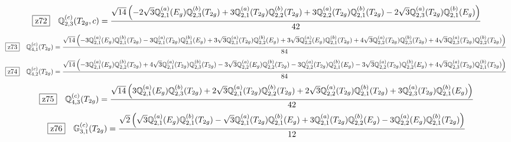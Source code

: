 \documentclass[fleqn,10pt,landscape]{jsarticle}
\begin{document}
\begin{dmath*}
\hspace*{3mm}\fbox{z72}\quad \mathbb{Q}_{2,3}^{(c)}(T_{2g},c)=\frac{\sqrt{14} \left(- 2 \sqrt{3} \mathbb{Q}_{2,1}^{(a)}(E_{g}) \mathbb{Q}_{2,3}^{(b)}(T_{2g}) + 3 \mathbb{Q}_{2,1}^{(a)}(T_{2g}) \mathbb{Q}_{2,2}^{(b)}(T_{2g}) + 3 \mathbb{Q}_{2,2}^{(a)}(T_{2g}) \mathbb{Q}_{2,1}^{(b)}(T_{2g}) - 2 \sqrt{3} \mathbb{Q}_{2,3}^{(a)}(T_{2g}) \mathbb{Q}_{2,1}^{(b)}(E_{g})\right)}{42}
\end{dmath*}
\begin{dmath*}
\hspace*{3mm}\fbox{z73}\quad \mathbb{Q}_{4,1}^{(c)}(T_{2g})=\frac{\sqrt{14} \left(- 3 \mathbb{Q}_{2,1}^{(a)}(E_{g}) \mathbb{Q}_{2,1}^{(b)}(T_{2g}) - 3 \mathbb{Q}_{2,1}^{(a)}(T_{2g}) \mathbb{Q}_{2,1}^{(b)}(E_{g}) + 3 \sqrt{3} \mathbb{Q}_{2,1}^{(a)}(T_{2g}) \mathbb{Q}_{2,2}^{(b)}(E_{g}) + 3 \sqrt{3} \mathbb{Q}_{2,2}^{(a)}(E_{g}) \mathbb{Q}_{2,1}^{(b)}(T_{2g}) + 4 \sqrt{3} \mathbb{Q}_{2,2}^{(a)}(T_{2g}) \mathbb{Q}_{2,3}^{(b)}(T_{2g}) + 4 \sqrt{3} \mathbb{Q}_{2,3}^{(a)}(T_{2g}) \mathbb{Q}_{2,2}^{(b)}(T_{2g})\right)}{84}
\end{dmath*}
\begin{dmath*}
\hspace*{3mm}\fbox{z74}\quad \mathbb{Q}_{4,2}^{(c)}(T_{2g})=\frac{\sqrt{14} \left(- 3 \mathbb{Q}_{2,1}^{(a)}(E_{g}) \mathbb{Q}_{2,2}^{(b)}(T_{2g}) + 4 \sqrt{3} \mathbb{Q}_{2,1}^{(a)}(T_{2g}) \mathbb{Q}_{2,3}^{(b)}(T_{2g}) - 3 \sqrt{3} \mathbb{Q}_{2,2}^{(a)}(E_{g}) \mathbb{Q}_{2,2}^{(b)}(T_{2g}) - 3 \mathbb{Q}_{2,2}^{(a)}(T_{2g}) \mathbb{Q}_{2,1}^{(b)}(E_{g}) - 3 \sqrt{3} \mathbb{Q}_{2,2}^{(a)}(T_{2g}) \mathbb{Q}_{2,2}^{(b)}(E_{g}) + 4 \sqrt{3} \mathbb{Q}_{2,3}^{(a)}(T_{2g}) \mathbb{Q}_{2,1}^{(b)}(T_{2g})\right)}{84}
\end{dmath*}
\begin{dmath*}
\hspace*{3mm}\fbox{z75}\quad \mathbb{Q}_{4,3}^{(c)}(T_{2g})=\frac{\sqrt{14} \left(3 \mathbb{Q}_{2,1}^{(a)}(E_{g}) \mathbb{Q}_{2,3}^{(b)}(T_{2g}) + 2 \sqrt{3} \mathbb{Q}_{2,1}^{(a)}(T_{2g}) \mathbb{Q}_{2,2}^{(b)}(T_{2g}) + 2 \sqrt{3} \mathbb{Q}_{2,2}^{(a)}(T_{2g}) \mathbb{Q}_{2,1}^{(b)}(T_{2g}) + 3 \mathbb{Q}_{2,3}^{(a)}(T_{2g}) \mathbb{Q}_{2,1}^{(b)}(E_{g})\right)}{42}
\end{dmath*}
\begin{dmath*}
\hspace*{3mm}\fbox{z76}\quad \mathbb{G}_{3,1}^{(c)}(T_{2g})=\frac{\sqrt{2} \left(\sqrt{3} \mathbb{Q}_{2,1}^{(a)}(E_{g}) \mathbb{Q}_{2,1}^{(b)}(T_{2g}) - \sqrt{3} \mathbb{Q}_{2,1}^{(a)}(T_{2g}) \mathbb{Q}_{2,1}^{(b)}(E_{g}) + 3 \mathbb{Q}_{2,1}^{(a)}(T_{2g}) \mathbb{Q}_{2,2}^{(b)}(E_{g}) - 3 \mathbb{Q}_{2,2}^{(a)}(E_{g}) \mathbb{Q}_{2,1}^{(b)}(T_{2g})\right)}{12}
\end{dmath*}
\end{document}
